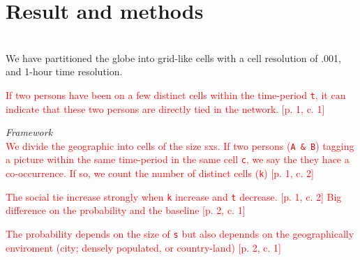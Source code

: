 \section{Result and methods}\\
We have partitioned the globe into grid-like cells with a cell resolution of .001\degree, and 1-hour time resolution. 

\textcolor{red}{If two persons have been on a few distinct cells within the time-period \texttt{t}, it can indicate that these two persons are directly tied in the network. [p. 1, c. 1]}

\textit{Framework}\\
\textcolor{red}{We divide the geographic into cells of the size sxs. 
If two persons (\texttt{A \& B}) tagging a picture within the same time-period in the same cell \texttt{c}, we say the they hace a co-occurrence. If so, we count the number of distinct cells (\texttt{k}) [p. 1, c. 2]}


\textcolor{red}{The social tie increase strongly when \texttt{k} increase and \texttt{t} decrease. [p. 1, c. 2]
Big difference on the probability and the baseline [p. 2, c. 1]}

\textcolor{red}{The probability depends on the size of \texttt{s} but also depennds on the geographically enviroment (city; densely populated, or country-land) [p. 2, c. 1]}